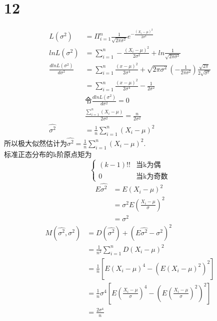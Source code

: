 \documentclass[a4paper,twocolumn]{ctexart}
\begin{document}
\section*{12}
\begin{align*}
L(\sigma^2)&=\Pi_{i=1}^{n}\frac{1}{\sqrt{2\pi\sigma^2}}e^{-\frac{(X_i-\mu)^2}{2\sigma^2}}\\
lnL(\sigma^2)&=\sum_{i=1}^{n}-\frac{(X_i-\mu)^2}{2\sigma^2}+ln\frac{1}{\sqrt{2\pi\sigma^2}}\\
\frac{dlnL(\sigma^2)}{d\sigma^2}&=\sum_{i=1}^{n}\frac{(x-\mu)^2}{2\sigma^4}+\sqrt{2\pi \sigma^2}(-\frac{1}{2\pi\sigma^2})\frac{\sqrt{2\pi}}{2\sqrt{\sigma^2}}\\
&=\sum_{i=1}^{n}\frac{(x-\mu)^2}{2\sigma^4}-\frac{1}{2\sigma^2}\\
&\text{令}\frac{dlnL(\sigma^2)}{d\sigma^2}=0\\
&\frac{\sum_{i=1}^{n}(X_i-\mu)}{2\sigma^2}=\frac{n}{2\sigma^2}\\
\hat{\sigma^2}&=\frac{1}{n}\sum_{i=1}^{n}(X_i-\mu)^2
\end{align*}
所以极大似然估计为$\hat{\sigma^2}=\frac{1}{n}\sum_{i=1}^{n}(X_i-\mu)^2$.\\
标准正态分布的k阶原点矩为\[
\begin{cases}
	(k-1)!!&\text{当k为偶}\\
	0&\text{当k为奇数}
\end{cases}\]
\begin{align*}
E\hat{\sigma^2}&=E(X_i-\mu)^2\\
&=\sigma^2E(\frac{X_i-\mu}{\sigma})^2\\
&=\sigma^2
\end{align*}
\begin{align*}
M(\hat{\sigma^2},\sigma^2)&=D(\hat{\sigma^2})+(E\hat{\sigma^2}-\sigma^2)^2\\
&=\frac{1}{n^2}\sum_{i=1}^{n}D(X_i-\mu)^2\\
&=\frac{1}{n}\left[E(X_i-\mu)^4-(E(X_i-\mu)^2)^2\right]\\
&=\frac{1}{n}\sigma^4\left[E(\frac{X_i-\mu}{\sigma})^4-(E(\frac{X_i-\mu}{\sigma})^2)^2\right]\\
&=\frac{2\sigma^4}{n}
\end{align*}
\end{document}
